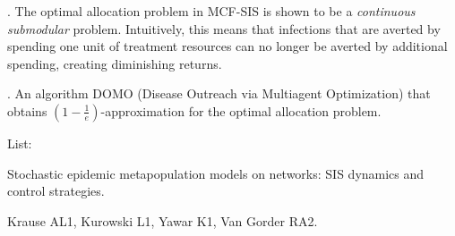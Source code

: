 \begin{enumerate}
\smallskip
{}. The optimal allocation problem in MCF-SIS is shown to be a \textit{continuous submodular} problem. Intuitively, this means that infections that are averted by spending one unit of treatment resources can no longer be averted by additional spending, creating diminishing returns.

\smallskip
{}. An algorithm DOMO (Disease Outreach via Multiagent Optimization) that obtains $(1- \frac{1}{e})$-approximation for the optimal allocation problem.

\smallskip
\noindent


\end{enumerate}




\newpage
List:

Stochastic epidemic metapopulation models on networks: SIS dynamics and control strategies.

Krause AL1, Kurowski L1, Yawar K1, Van Gorder RA2.

